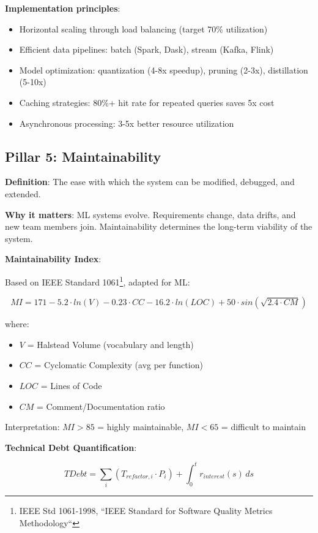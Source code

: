 \textbf{Implementation principles}:
\begin{itemize}
    \item Horizontal scaling through load balancing (target 70\% utilization)
    \item Efficient data pipelines: batch (Spark, Dask), stream (Kafka, Flink)
    \item Model optimization: quantization (4-8x speedup), pruning (2-3x), distillation (5-10x)
    \item Caching strategies: 80\%+ hit rate for repeated queries saves 5x cost
    \item Asynchronous processing: 3-5x better resource utilization
\end{itemize}

\subsection{Pillar 5: Maintainability}

\textbf{Definition}: The ease with which the system can be modified, debugged, and extended.

\textbf{Why it matters}: ML systems evolve. Requirements change, data drifts, and new team members join. Maintainability determines the long-term viability of the system.

\textbf{Maintainability Index}:

Based on IEEE Standard 1061\footnote{IEEE Std 1061-1998, ``IEEE Standard for Software Quality Metrics Methodology``}, adapted for ML:

\begin{equation}
MI = 171 - 5.2 \cdot ln(V) - 0.23 \cdot CC - 16.2 \cdot ln(LOC) + 50 \cdot sin(\sqrt{2.4 \cdot CM})
\end{equation}

where:
\begin{itemize}
    \item $V$ = Halstead Volume (vocabulary and length)
    \item $CC$ = Cyclomatic Complexity (avg per function)
    \item $LOC$ = Lines of Code
    \item $CM$ = Comment/Documentation ratio
\end{itemize}

Interpretation: $MI > 85$ = highly maintainable, $MI < 65$ = difficult to maintain

\textbf{Technical Debt Quantification}:

\begin{equation}
TDebt = \sum_{i} \left( T_{refactor,i} \cdot P_i \right) + \int_{0}^{t} r_{interest}(s) \, ds
\end{equation}

